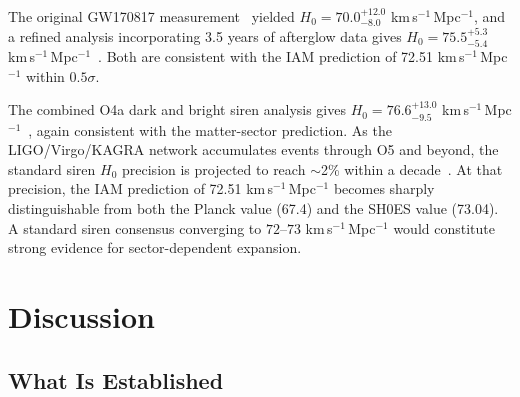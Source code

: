 \documentclass[aps,prd,twocolumn,superscriptaddress,nofootinbib]{revtex4-2}
\begin{document}
The original GW170817 measurement~\cite{Abbott2017siren} yielded $H_0 = 70.0^{+12.0}_{-8.0}$ km\,s$^{-1}$\,Mpc$^{-1}$, and a refined analysis incorporating 3.5 years of afterglow data gives $H_0 = 75.5^{+5.3}_{-5.4}$ km\,s$^{-1}$\,Mpc$^{-1}$~\cite{Nicolaou2023}. Both are consistent with the IAM prediction of 72.51 km\,s$^{-1}$\,Mpc$^{-1}$ within $0.5\sigma$.

The combined O4a dark and bright siren analysis gives $H_0 = 76.6^{+13.0}_{-9.5}$ km\,s$^{-1}$\,Mpc$^{-1}$~\cite{GWSirens2026review}, again consistent with the matter-sector prediction. As the LIGO/Virgo/KAGRA network accumulates events through O5 and beyond, the standard siren $H_0$ precision is projected to reach $\sim$2\% within a decade~\cite{GWSirens2026review}. At that precision, the IAM prediction of 72.51 km\,s$^{-1}$\,Mpc$^{-1}$ becomes sharply distinguishable from both the Planck value (67.4) and the SH0ES value (73.04). A standard siren consensus converging to $72$--$73$ km\,s$^{-1}$\,Mpc$^{-1}$ would constitute strong evidence for sector-dependent expansion.

\section{Discussion}
\label{sec:discussion}

\subsection{What Is Established}
\end{document}

